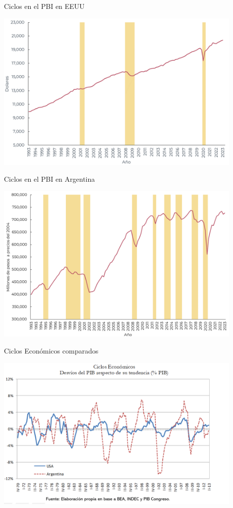 \documentclass{beamer}
\begin{document}
\begin{frame}{Ciclos en el PBI en EEUU}

\centering\includegraphics[width=12cm]{../Figures/32.8.png}\

\end{frame}

\begin{frame}{Ciclos en el PBI en Argentina}

\centering\includegraphics[width=12cm]{../Figures/32.9.png}\

\end{frame}

\begin{frame}{Ciclos Económicos comparados}

    \centering\includegraphics[width=12cm]{../Figures/P12.png}
    
\end{frame}
\end{document}
